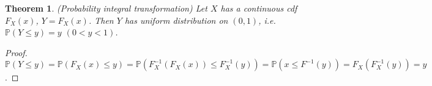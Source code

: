 \documentclass[11pt]{article}
\def\BP{{\bf P}}
\def\BP{{\mathbb P}}
\newtheorem{theorem}{Theorem}[section]
\begin{document}
\begin{theorem}(Probability integral transformation)
Let $X$ has a continuous cdf $F_X(x)$, $Y=F_X(x)$. Then $Y$ has uniform distribution on $(0, 1)$, i.e. $\BP(Y \leq y) = y$ $(0 < y < 1)$.
\end{theorem}

\begin{proof}
$\BP(Y \leq y) = \BP(F_X(x) \leq y) = \BP(F_X^{-1}(F_X(x)) \leq F_X^{-1}(y)) = \BP(x \leq F^{-1}(y)) = F_X(F_X^{-1}(y)) = y$.
\end{proof}
\end{document}
